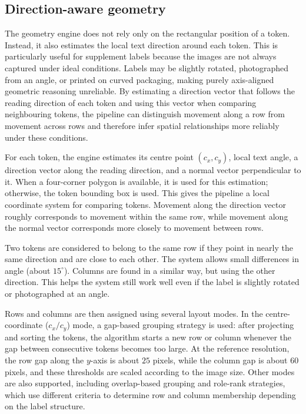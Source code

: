 \subsection{Direction-aware geometry}\label{sec:enrichment-geometry}

The geometry engine does not rely only on the rectangular position of a token. Instead, it also estimates the local text direction around each token. This is particularly useful for supplement labels because the images are not always captured under ideal conditions. Labels may be slightly rotated, photographed from an angle, or printed on curved packaging, making purely axis-aligned geometric reasoning unreliable. By estimating a direction vector that follows the reading direction of each token and using this vector when comparing neighbouring tokens, the pipeline can distinguish movement along a row from movement across rows and therefore infer spatial relationships more reliably under these conditions.

For each token, the engine estimates its centre point \((c_x, c_y)\), local text angle, a direction vector along the reading direction, and a normal vector perpendicular to it. When a four-corner polygon is available, it is used for this estimation; otherwise, the token bounding box is used. This gives the pipeline a local coordinate system for comparing tokens. Movement along the direction vector roughly corresponds to movement within the same row, while movement along the normal vector corresponds more closely to movement between rows.

Two tokens are considered to belong to the same row if they point in nearly the same direction and are close to each other. The system allows small differences in angle (about \(15^\circ\)). Columns are found in a similar way, but using the other direction. This helps the system still work well even if the label is slightly rotated or photographed at an angle.

Rows and columns are then assigned using several layout modes. In the centre-coordinate (\(c_x/c_y\)) mode, a gap-based grouping strategy is used: after projecting and sorting the tokens, the algorithm starts a new row or column whenever the gap between consecutive tokens becomes too large. At the reference resolution, the row gap along the \(y\)-axis is about \(25\) pixels, while the column gap is about \(60\) pixels, and these thresholds are scaled according to the image size. Other modes are also supported, including overlap-based grouping and role-rank strategies, which use different criteria to determine row and column membership depending on the label structure.

